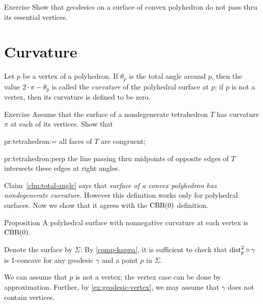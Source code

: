\begin{thm}{Exercise}\label{ex:geodesic-vertex}
Show that geodesics on a surface of convex polyhedron do not pass thru its essential vertices.
\end{thm}

\section{Curvature}

Let $p$ be a vertex of a polyhedron.
If $\theta_p$ is the total angle around $p$, then the value $2\cdot \pi -\theta_p$ is called the \emph{curvature} of the polyhedral surface at $p$;
if $p$ is not a vertex, then its curvature is defined to be zero.

\begin{thm}{Exercise}\label{pr:tetrahedron} 
Assume that the surface of a nondegenerate tetrahedron $T$ has curvature $\pi$ at each of its vertices.
Show that 

\begin{subthm}{pr:tetrahedron:=}
all faces of $T$ are congruent; 
\end{subthm}

\begin{subthm}{pr:tetrahedron:perp} the line passing thru midpoints of opposite edges of $T$ intersects these edges at right angles.
\end{subthm}
 
\end{thm}

Claim~\ref{clm:total-angle} says that \textit{surface of a convex polyhedron has nondegenerate curvature}.
However this definition works only for polyhedral surfaces.
Now we show that it agrees with the $\mathrm{CBB}(0)$ definition.

\begin{thm}{Proposition}\label{prop:poly-CBB}
A polyhedral surface with nonnegative curvature at each vertex is $\mathrm{CBB}(0)$.
\end{thm}

Denote the surface by $\Sigma$.
By \ref{comp-kappa}, it is sufficient to check that 
$\mathrm{dist}_p^2\circ\gamma$ is 1-concave for any geodesic $\gamma$ and a point $p$ in $\Sigma$.

We can assume that $p$ is not a vertex;
the vertex case can be done by approximation.
Further, by \ref{ex:geodesic-vertex}, we may assume that $\gamma$ does not contain vertices.


